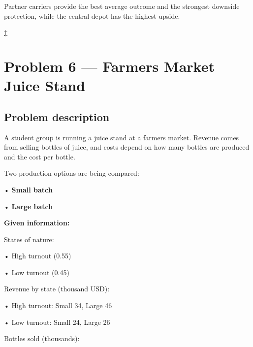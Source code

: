 \documentclass[11pt]{article}
\begin{document}
	
	
	Partner carriers provide the best average outcome and the strongest downside protection, while the central depot has the highest upside.
	
	
	
	\hyperref[problem5-criteria]{↑}
	\section*{Problem 6 — Farmers Market Juice Stand}
	
	\label{problem3a}
	
	\subsection*{Problem description}
	
	\label{problem3a-problem}
	
	A student group is running a juice stand at a farmers market. Revenue comes from selling bottles of juice, and costs depend on
	how many bottles are produced and the cost per bottle.
	
	
	
	
	
	
	Two production options are being compared:
	
	
	
	• \textbf{Small batch}
	
	
	
	• \textbf{Large batch}
	
	
	
	
	
	\textbf{Given information:}
	
	
	
	States of nature:
	
	
	
	• High turnout (0.55)
	
	
	
	• Low turnout (0.45)
	
	
	
	
	
	Revenue by state (thousand USD):
	
	
	
	• High turnout: Small 34, Large 46
	
	
	
	• Low turnout: Small 24, Large 26
	
	
	
	
	
	Bottles sold (thousands):
	
	
	
\end{document}
